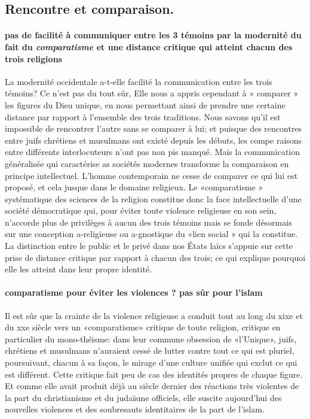 \subsection{Rencontre et comparaison.}

\paragraph{pas de facilité à communiquer entre les 3 témoins par la modernité du fait du \textit{comparatisme} et une distance critique qui atteint chacun des trois religions}
La modernité occidentale a-t-elle facilité la communication entre les trois témoins? Ce n'est pas du tout sûr, Elle nous a appris cependant à « comparer » les figures du Dieu unique, en nous permettant ainsi de prendre une certaine distance par rapport à l'ensemble des trois traditions.
Nous savons qu'il est impossible de rencontrer l'autre sans se comparer à lui; et puisque des rencontres entre juifs chrétiens et musulmans ont existé depuis les débuts, les compe raisons entre différents interlocuteurs n'ont pas non pis manqué. Mais la communication généralisée qui caractérise as sociétés modernes transforme la comparaison en principe intellectuel. L'homme contemporain ne cesse de comparer ce qui lui est proposé, et cela jusque dans le domaine religieux. Le «comparatisme » systématique des sciences de la religion  constitue donc la face intellectuelle d'une société démocratique qui, pour éviter toute violence religieuse en son sein, n'accorde plus de privilèges à aucun des trois témoins mais se fonde désormais sur une conception a-religieuse ou a-gnostique du «lien social » qui la constitue. La distinction entre le public et le privé dans nos États laïcs s'appuie sur cette prise de distance critique par rapport à chacun des trois; ce qui explique pourquoi elle les atteint dans leur propre identité.
\paragraph{comparatisme pour éviter les violences ? pas sûr pour l'islam}
Il est sûr que la crainte de la violence religieuse a conduit tout au long du xixe et du xxe siècle vers un «comparatisme» critique de toute religion, critique en particulier du mono-théisme: dans leur commune obsession de «l'Unique», juifs, chrétiens et musulmans n'auraient cessé de lutter contre tout ce qui est pluriel, poursuivant, chacun à sa façon, le mirage d'une culture unifiée qui exclut ce qui est différent. Cette critique fait peu de cas des identités propres de chaque figure. 
Et comme elle avait produit déjà au siècle dernier des réactions très violentes de la part du christianisme et du judaïsme officiels, elle suscite aujourd'hui des nouvelles violences et des soubresauts identitaires de la part de l'islam. 
